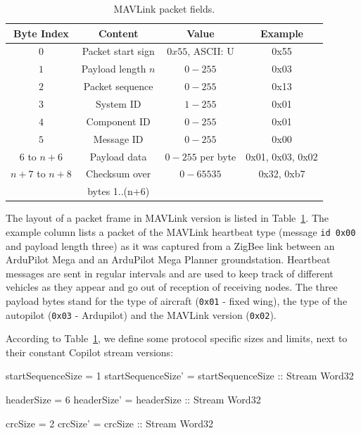 \begin{table}

  \caption{MAVLink packet fields.}
  \label{MAVLinkPacketTable}
\begin{center}
  \begin{tabular}{ | c | c | c | c | }
    \hline
    Byte Index & Content & Value & Example \\
    \hline
    $0$ & Packet start sign & $0x55$, ASCII: U & 0x55 \\
    $1$ & Payload length $n$ & $0 - 255$ & 0x03 \\
    $2$ & Packet sequence & $0 - 255$ & 0x13 \\
    $3$ & System ID & $1 - 255$ & 0x01 \\
    $4$ & Component ID & $0 - 255$ & 0x01 \\
    $5$ & Message ID & $0 - 255$ & 0x00 \\
    $6$ to $n+6$ & Payload data & $0 - 255$ per byte & 0x01, 0x03, 0x02 \\
    $n+7$ to $n+8$ & Checksum over  & $0-65535$ & 0x32, 0xb7 \\
                   & bytes 1..(n+6) &           &            \\
    \hline
  \end{tabular}
\end{center}
\end{table}

The layout of a packet frame in MAVLink version is listed in
Table~\ref{MAVLinkPacketTable}.  
The example column lists a packet of the MAVLink heartbeat type (message {\tt id 0x00}
and payload length three) as it was captured from a ZigBee link between an ArduPilot
Mega and an ArduPilot Mega Planner groundstation. Heartbeat messages are sent
in regular intervals and are used to keep track of different vehicles as
they appear and go out of reception of receiving nodes. The three payload bytes
stand for the type of aircraft ({\tt 0x01} - fixed wing), the type of the autopilot
({\tt 0x03} - Ardupilot) and the MAVLink version ({\tt 0x02}).

According to Table~\ref{MAVLinkPacketTable}, we define some protocol specific
sizes and limits, next to their constant Copilot stream versions:

\begin{code}
startSequenceSize  = 1
startSequenceSize' = startSequenceSize :: Stream Word32

headerSize  = 6
headerSize' = headerSize :: Stream Word32

crcSize  = 2
crcSize' = crcSize :: Stream Word32
\end{code}

